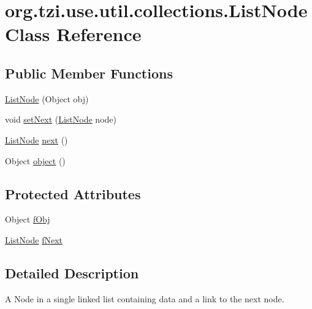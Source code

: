 \hypertarget{classorg_1_1tzi_1_1use_1_1util_1_1collections_1_1_list_node}{\section{org.\-tzi.\-use.\-util.\-collections.\-List\-Node Class Reference}
\label{classorg_1_1tzi_1_1use_1_1util_1_1collections_1_1_list_node}
}
\subsection*{Public Member Functions}
\begin{DoxyCompactItemize}
\item 
\hyperlink{classorg_1_1tzi_1_1use_1_1util_1_1collections_1_1_list_node_a5e8b455d4d277d84785ce774b34c0192}{List\-Node} (Object obj)
\item 
void \hyperlink{classorg_1_1tzi_1_1use_1_1util_1_1collections_1_1_list_node_a7c1117947643a65a26c78db23011ef5d}{set\-Next} (\hyperlink{classorg_1_1tzi_1_1use_1_1util_1_1collections_1_1_list_node}{List\-Node} node)
\item 
\hyperlink{classorg_1_1tzi_1_1use_1_1util_1_1collections_1_1_list_node}{List\-Node} \hyperlink{classorg_1_1tzi_1_1use_1_1util_1_1collections_1_1_list_node_ae5acb9873047d5cc659d78b20c74811b}{next} ()
\item 
Object \hyperlink{classorg_1_1tzi_1_1use_1_1util_1_1collections_1_1_list_node_abaa46508225729a16cf54fa541952737}{object} ()
\end{DoxyCompactItemize}
\subsection*{Protected Attributes}
\begin{DoxyCompactItemize}
\item 
Object \hyperlink{classorg_1_1tzi_1_1use_1_1util_1_1collections_1_1_list_node_a7b4ea96da1442b8bedcc743b95e17ab5}{f\-Obj}
\item 
\hyperlink{classorg_1_1tzi_1_1use_1_1util_1_1collections_1_1_list_node}{List\-Node} \hyperlink{classorg_1_1tzi_1_1use_1_1util_1_1collections_1_1_list_node_a3d0b7278524278d7ec4d9564e672f206}{f\-Next}
\end{DoxyCompactItemize}


\subsection{Detailed Description}
A Node in a single linked list containing data and a link to the next node.

